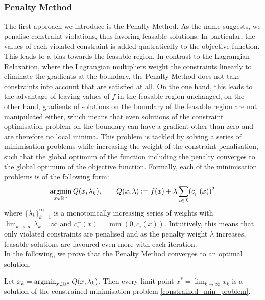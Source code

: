 \subsubsection{Penalty Method}
The first approach we introduce is the Penalty Method. As the name suggests, we penalise constraint violations, thus favoring feasable solutions. In particular, the values of each violated constraint is added quatratically to the objective function. This leads to a bias towards the feasable region. In contrast to the Lagrangian Relaxation, where the Lagrangian multipliers weight the constraints linearly to eliminate the gradients at the boundary, the Penalty Method does not take constraints into account that are satisfied at all. On the one hand, this leads to the advantage of leaving values of $f$ in the feasable region unchanged, on the other hand, gradients of solutions on the boundary of the feasable region are not manipulated either, which means that even solutions of the constraint optimisation problem on the boundary can have a gradient other than zero and are therefore no local minima. This problem is tackled by solving a series of minimisation problems while increasing the weight of the constraint penalisation, such that the global optimum of the function including the penalty converges to the global optimum of the objective function. Formally, each of the minimisation problems is of the following form:
\[\operatorname*{argmin}_{x \in \mathbb{R}^n} Q(x, \lambda_k), \qquad Q(x, \lambda) := f(x) + \lambda \sum_{i \in \mathcal{I}} (c_i^{-}(x))^2\]
where $\{\lambda_k\}_{k=1}^\infty$ is a monotonically increasing series of weights with $\lim_{k \to \infty} \lambda_k = \infty$ and $c_i^-(x) = \min(0, c_i(x))$. Intuitively, this means that only violated constraints are penalised and as the penalty weight $\lambda$ increases, feasable solutions are favoured even more with each iteration.\\
In the following, we prove that the Penalty Method converges to an optimal solution.
\begin{theorem}
	Let $x_k = \operatorname*{argmin}_{x \in \mathbb{R}^n} Q(x, \lambda_k)$. Then every limit point $x^* = \lim_{k \to \infty} x_k$ is a solution of the constrained minimisation problem \eqref{constrained_min_problem}.
\end{theorem}
